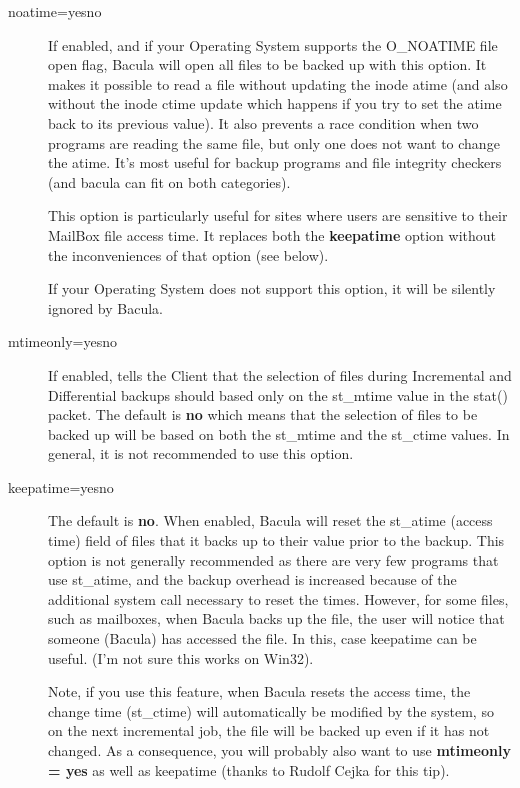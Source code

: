 \begin{description}
\item [noatime=yes\vb{}no]
   If enabled, and if your Operating System supports the O\_NOATIME file
   open flag, Bacula will open all files to be backed up with this option.
   It makes it possible to read a file without updating the inode atime
   (and also without the inode ctime update which happens if you try to set
   the atime back to its previous value).  It also prevents a race
   condition when two programs are reading the same file, but only one does
   not want to change the atime.  It's most useful for backup programs and
   file integrity checkers (and bacula can fit on both categories).

   This option is particularly useful for sites where users are sensitive
   to their MailBox file access time.  It replaces both the {\bf keepatime}
   option without the inconveniences of that option (see below).

   If your Operating System does not support this option, it will be
   silently ignored by Bacula.


\item [mtimeonly=yes\vb{}no]
   If enabled, tells the Client that the selection of files during
   Incremental and Differential backups should based only on the st\_mtime
   value in the stat() packet.  The default is {\bf no} which means that
   the selection of files to be backed up will be based on both the
   st\_mtime and the st\_ctime values.  In general, it is not recommended
   to use this option.

\item [keepatime=yes\vb{}no]
   The default is {\bf no}.  When enabled, Bacula will reset the st\_atime
   (access time) field of files that it backs up to their value prior to
   the backup.  This option is not generally recommended as there are very
   few programs that use st\_atime, and the backup overhead is increased
   because of the additional system call necessary to reset the times.
   However, for some files, such as mailboxes, when Bacula backs up the
   file, the user will notice that someone (Bacula) has accessed the
   file. In this, case keepatime can be useful.
   (I'm not sure this works on Win32).

   Note, if you use this feature, when Bacula resets the access time, the
   change time (st\_ctime) will automatically be modified by the system,
   so on the next incremental job, the file will be backed up even if
   it has not changed. As a consequence, you will probably also want
   to use {\bf mtimeonly = yes} as well as keepatime (thanks to
   Rudolf Cejka for this tip).


\end{description}

